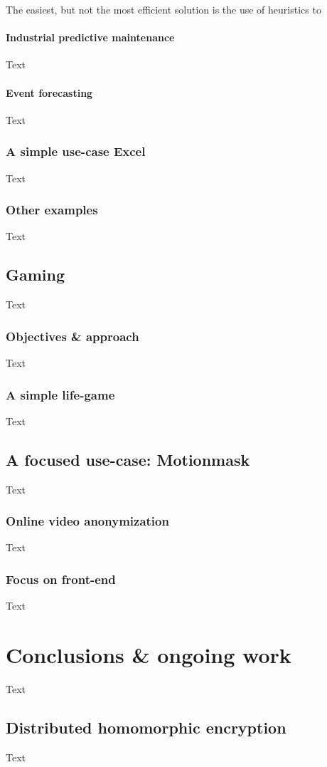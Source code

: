 \documentclass{article}
\begin{document}
The easiest, but not the most efficient solution is the use of heuristics to 

\paragraph{Industrial predictive maintenance}
Text
\paragraph{Event forecasting}
Text

\subsubsection{A simple use-case Excel}
Text
\subsubsection{Other examples}
Text

\subsection{Gaming}
Text
\subsubsection{Objectives \& approach}
Text
\subsubsection{A simple life-game}
Text

\subsection{A focused use-case: Motionmask \texttrademark}
Text
\subsubsection{Online video anonymization}
Text
\subsubsection{Focus on front-end}
Text

\section{Conclusions \& ongoing work}
Text
\subsection{Distributed homomorphic encryption}
Text
\end{document}
